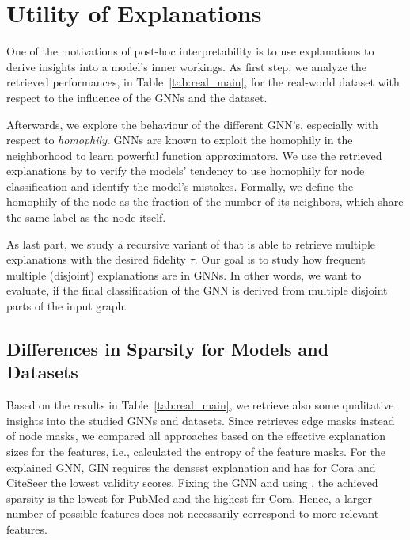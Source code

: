 
\section{Utility of Explanations}
\label{sec:utility}

One of the motivations of post-hoc interpretability is to use explanations to derive insights into a model's inner workings. 
As first step, we analyze the retrieved performances, in Table~\ref{tab:real_main}, for the real-world dataset with respect to the influence of the GNNs and the dataset. 

Afterwards, we explore the behaviour of the different GNN's, especially with respect to \textit{homophily}.
GNNs are known to exploit the homophily in the neighborhood to learn powerful function approximators. We use the retrieved explanations by \approach{} to verify the models' tendency to use homophily for node classification and identify the model's mistakes.
Formally, we define the homophily of the node as the fraction of the number of its neighbors, which share the same label as the node itself. 

As last part, we study a recursive variant of \approach{} that is able to retrieve multiple explanations with the desired fidelity $\tau$. 
Our goal is to study how frequent multiple (disjoint) explanations are in GNNs. 
In other words, we want to evaluate, if the final classification of the GNN is derived from multiple disjoint parts of the input graph.

\subsection{Differences in Sparsity for Models and Datasets}
Based on the results in Table~\ref{tab:real_main}, we retrieve also some qualitative insights into the studied GNNs and datasets. 
Since \gnnexp{} retrieves edge masks instead of node masks, we compared all approaches based on the effective explanation sizes for the features, i.e., calculated the entropy of the feature masks.
For the explained GNN, GIN requires the densest explanation and has for Cora and CiteSeer the lowest validity scores. 
Fixing the GNN and using \approach{}, the achieved sparsity is the lowest for PubMed and the highest for Cora. 
Hence, a larger number of possible features does not necessarily correspond to more relevant features. 

